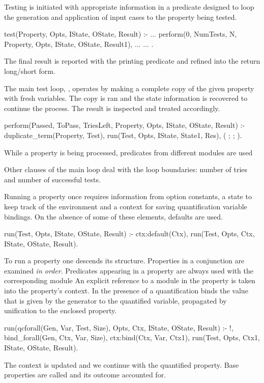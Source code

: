 Testing is initiated with appropriate information in a predicate
designed to loop the generation and application of input cases to the
property being tested.
%
\begin{yapcode}
 test(Property, Opts,
      IState, OState, Result) :-
   ...
   perform(0, NumTests, N, Property, Opts,
           IState, OState, Result1),
   ...
   ...
 .
\end{yapcode}
%
The final result is reported with the printing predicate and refined
into the return long/short form.


The main test loop, , operates by making a complete copy
of the given property with fresh variables.
%
The copy is ran and the state information is recovered to continue the
process.
%
The result is inspected and treated accordingly.
%
\begin{yapcode}
 perform(Passed, ToPass, TriesLeft, Property,
         Opts, IState, OState, Result) :-
   duplicate_term(Property, Test),
   run(Test, Opts, IState, State1, Res),
   (
   ;
   ;
   ).
\end{yapcode}While a property is being processed, predicates from different modules
are used

%
Other clauses of the main loop deal with the loop boundaries: number of
tries and number of successful tests.


Running a property once requires information from option constants, a state to
keep track of the environment and a context for saving quantification
variable bindings.
%
On the absence of some of these elements, defaults are used.
%
\begin{yapcode}
run(Test, Opts, IState, OState, Result) :-
        ctx:default(Ctx),
        run(Test, Opts, Ctx,
            IState, OState, Result).
\end{yapcode}


To run a property one descends its structure.
%
Properties in a conjunction are examined \emph{in order}.
%
Predicates appearing in a property are always used with the
corresponding module
%
An explicit reference to a module in the property is taken into the
property's context.
%
In the presence of a \plqc{} quantification binds the value that is given
by the generator to the quantified variable, propagated by unification
to the enclosed property.
%
\begin{yapcode}
run(qcforall(Gen, Var, Test, Size),
    Opts, Ctx, IState, OState, Result) :- 
  !, bind_forall(Gen, Ctx, Var, Size),
  ctx:bind(Ctx, Var, Ctx1),
  run(Test, Opts, Ctx1, IState, OState, Result).
\end{yapcode}
The context is updated and we continue with the quantified property.
%
Base properties are called and its outcome accounted for.
%


